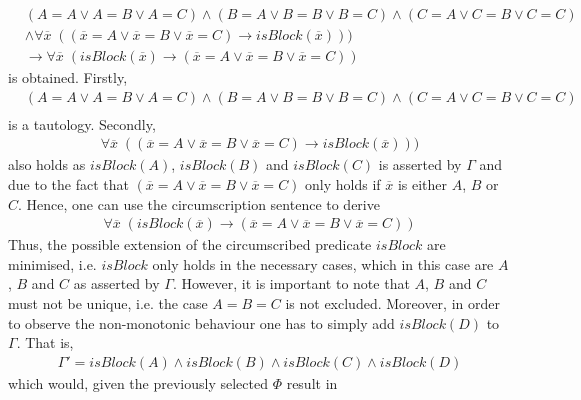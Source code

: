 \documentclass{article}
\begin{document}
\begin{equation*}
\begin{split}
&(A=A \vee A=B \vee A=C)\wedge (B=A \vee B=B \vee B=C) \wedge (C=A \vee C=B \vee C=C) \\
& \wedge \forall \overline{x} \; ((\overline{x}=A \vee \overline{x}=B \vee \overline{x}=C)\to isBlock(\overline{x})))  \\
& \to  \forall \overline{x} \; (isBlock(\overline{x})   \to  (\overline{x}=A \vee \overline{x}=B \vee \overline{x}=C))
\end{split}
\end{equation*} 
is obtained. Firstly, 
\begin{equation*}
\begin{split}
&(A=A \vee A=B \vee A=C)\wedge (B=A \vee B=B \vee B=C) \wedge (C=A \vee C=B \vee C=C) \\
\end{split}
\end{equation*}
is a tautology. Secondly,   
\begin{equation*}
\begin{split}
\forall \overline{x} \; ((\overline{x}=A \vee \overline{x}=B \vee \overline{x}=C)\to isBlock(\overline{x}))) 
\end{split}
\end{equation*}
also holds as $isBlock(A)$, $isBlock(B)$ and $isBlock(C)$ is asserted by $\Gamma$ and due to the fact that  $(\overline{x}=A \vee \overline{x}=B \vee \overline{x}=C)$ only holds if 
$\overline{x}$ is either $A$, $B$ or $C$. Hence, one can use the circumscription sentence to derive 
\begin{equation*}
\begin{split}
\forall \overline{x} \; (isBlock(\overline{x})   \to  (\overline{x}=A \vee \overline{x}=B \vee \overline{x}=C))
\end{split}
\end{equation*}
Thus, the possible extension of the circumscribed predicate $isBlock$ are minimised, i.e. $isBlock$ only holds in the necessary cases, which in this case are $A$, $B$ and $C$ as asserted by $\Gamma$. However, it is important to note that $A$, $B$ and $C$ must not be unique, i.e. the case $A=B=C$ is not excluded. Moreover, in order to observe the non-monotonic behaviour one has to simply add $isBlock(D)$ to $\Gamma$. That is, 
\begin{equation*}
\begin{split}
\Gamma' = isBlock(A) \wedge isBlock(B) \wedge isBlock(C) \wedge isBlock(D)
\end{split}
\end{equation*}
which would, given the previously selected $\Phi$ result in 
\end{document}
